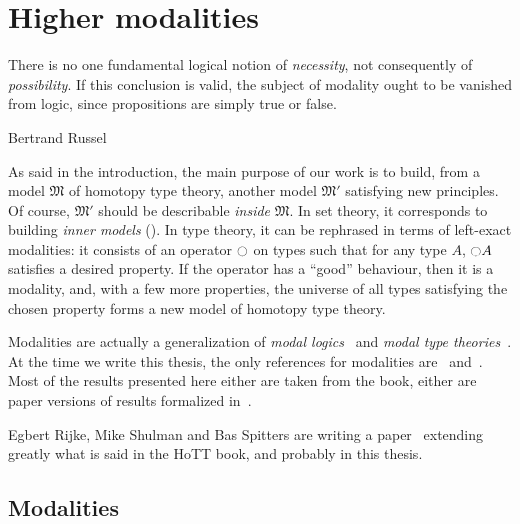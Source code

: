 \chapter{Higher modalities}
\label{chap:modalities}

\epigraph{There is no one fundamental logical notion of {\em
    necessity}, not consequently of {\em possibility}. If this
  conclusion is valid, the subject of modality ought to be vanished
  from logic, since propositions are simply true or false.}{Bertrand Russel}

As said in the introduction, the main purpose of our work is to build,
from a model $\mathfrak M$ of homotopy type theory, another model
$\mathfrak M'$ satisfying new principles. Of course, $\mathfrak M'$
should be describable {\em inside} $\mathfrak M$. In set theory, it
corresponds to building {\em inner models} (\cite{kunen}). 
%
In type theory, it can be rephrased in terms of left-exact modalities:
it consists of an operator $\ocircle$ on types such that for any type
$A$, $\ocircle A$ satisfies a desired property. If the operator has a
``good'' behaviour, then it is a modality, and, with a few more
properties, the universe of all types satisfying the chosen property
forms a new model of homotopy type theory.

Modalities are actually a generalization of {\em modal logics}~\cite{goldblatt-modal} and
{\em modal type theories}~\cite{moggi-monad}. At the time we write this
thesis, the only references for modalities
are~\cite{shulman-higher-modalities} and~\cite[Section
7.7]{hottbook}. 
Most of the results presented here either are taken from the book,
either are paper versions of results formalized in~\cite[{Folder
  }]{hottlib}.

Egbert Rijke, Mike Shulman and Bas Spitters
are writing a paper~\cite{RijkeShulmanSpitters} extending greatly what is said in the HoTT book,
and probably in this thesis.


\section{Modalities}
\label{sec:modalities}


